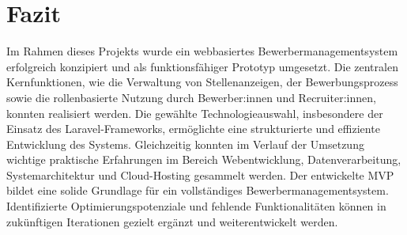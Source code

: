 \section{Fazit}
Im Rahmen dieses Projekts wurde ein webbasiertes Bewerbermanagementsystem erfolgreich konzipiert und als funktionsfähiger Prototyp umgesetzt. 
Die zentralen Kernfunktionen, wie die Verwaltung von Stellenanzeigen, der Bewerbungsprozess sowie die rollenbasierte Nutzung durch Bewerber:innen und Recruiter:innen, konnten realisiert werden.
\newline
Die gewählte Technologieauswahl, insbesondere der Einsatz des Laravel-Frameworks, ermöglichte eine strukturierte und effiziente Entwicklung des Systems. 
Gleichzeitig konnten im Verlauf der Umsetzung wichtige praktische Erfahrungen im Bereich Webentwicklung, Datenverarbeitung, Systemarchitektur und Cloud-Hosting gesammelt werden.
\newline
Der entwickelte MVP bildet eine solide Grundlage für ein vollständiges Bewerbermanagementsystem. 
Identifizierte Optimierungspotenziale und fehlende Funktionalitäten können in zukünftigen Iterationen gezielt ergänzt und weiterentwickelt werden.
